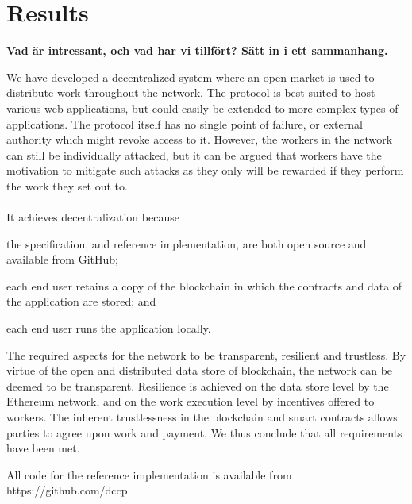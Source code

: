 \chapter{Results}
\textbf{Vad är intressant, och vad har vi tillfört? Sätt in i ett sammanhang.}

We have developed a decentralized system where an open market is used to distribute work throughout the network. The protocol is best suited to host various web applications, but could easily be extended to more complex types of applications. The protocol itself has no single point of failure, or external authority which might revoke access to it. However, the workers in the network can still be individually attacked, but it can be argued that workers have the motivation to mitigate such attacks as they only will be rewarded if they perform the work they set out to.
\\\\
It achieves decentralization because
\begin{inparaenum}
\item the specification, and reference implementation, are both open source and available from GitHub;
\item each end user retains a copy of the blockchain in which the contracts and data of the application are stored; and
\item each end user runs the application locally. 
\end{inparaenum}

The required aspects for the network to be transparent, resilient and trustless. By virtue of the open and distributed data store of blockchain, the network can be deemed to be transparent. Resilience is achieved on the data store level by the Ethereum network, and on the work execution level by incentives offered to workers. The inherent trustlessness in the blockchain and smart contracts allows parties to agree upon work and payment. We thus conclude that all requirements have been met.

All code for the reference implementation is available from https://github.com/dccp.